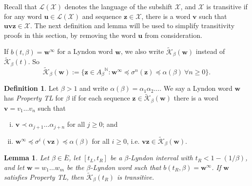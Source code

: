 \documentclass[11pt]{amsart}
\newtheorem{lemma}[theorem]{Lemma}
\theoremstyle{definition}
\newtheorem{definition}[theorem]{Definition}
\theoremstyle{remark}
\numberwithin{equation}{section}
\newcommand{\N}{\ensuremath{\mathbb{N}}}
\newcommand{\Kt}{\widetilde{\mathcal{K}}}
\newcommand{\cL}{\mathcal{L}}
\newcommand{\XX}{\mathcal{X}}
\renewcommand{\u}{\mathbf{u}}
\renewcommand{\v}{\mathbf{v}}
\newcommand{\w}{\mathbf{w}}
\newcommand{\z}{\mathbf{z}}
\newcommand{\f}{\infty}
\newcommand{\al}{\alpha}
\newcommand{\lle}{\preccurlyeq}
\newcommand{\si}{\sigma}
\begin{document}
Recall that $\cL(\XX)$ denotes the language of the subshift $\XX$, and $\mathcal{X}$ is transitive if for any word $\u\in\cL(\mathcal{X})$ and sequence $\z\in\mathcal{X}$, there is a word $\v$ such that $\u\v\z\in\mathcal{X}$. The next definition and lemma will be used to simplify transitivity proofs in this section, by removing the word $\u$ from consideration.

If $b(t,\beta)=\w^\f$ for a Lyndon word $\w$, we also write $\Kt_\beta(\w)$ instead of $\Kt_\beta(t)$. So
\[
\Kt_\beta(\w):=\{\z\in{A_\beta}^\N: \w^\f\lle \sigma^n(\z)\lle \alpha(\beta)\ \forall n\geq 0\}.
\]

\begin{definition} \label{def:property-TL}
Let $\beta{>1}$ and write $\al(\beta)=\al_1\al_2\ldots$. We say a Lyndon word $\w$ has {\em Property TL} for $\beta$ if for each sequence $\z\in\Kt_\beta(\w)$ there is a word $\v=v_1\dots v_n$ such that
\begin{enumerate}[(i)]
\item $\v\prec \al_{j+1}\dots\al_{j+n}$ for all $j\geq 0$; and
\item $\w^\f\lle\si^i(\v\z)\lle \al(\beta)$ for all $i\geq 0$, i.e. $\v\z\in\Kt_\beta(\w)$.
\end{enumerate}
\end{definition}

\begin{lemma} \label{lem:transitivity-simplified}
Let $\beta\in\overline{E}$, let $[t_L,t_R]$ be a $\beta$-Lyndon interval with $t_R<1-(1/\beta)$, and let $\w=w_1\dots w_m$ be the $\beta$-Lyndon word such that $b(t_R,\beta)=\w^\f$. If $\w$ satisfies Property TL, then $\Kt_\beta(t_R)$ is transitive.
\end{lemma}
\end{document}
